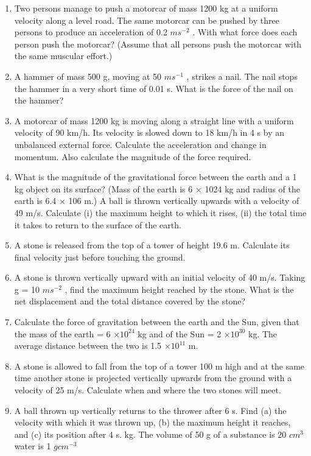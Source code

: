 \begin{enumerate}[label=\arabic*.,ref=\thesubsection.\theenumi]
\item Two persons manage to push a motorcar of mass 1200 kg at a uniform velocity along a level road. The same motorcar can be pushed by three persons to produce an acceleration of 0.2 $m s^{-2}$
. With what force does each person push the motorcar? (Assume that all persons push the motorcar with the same muscular effort.)
\item  A hammer of mass 500 g, moving at 50 $m s^{-1}$ , strikes a nail.
The nail stops the hammer in a very short time of 0.01 s. What is the force of the nail on the hammer?
\item  A motorcar of mass 1200 kg is moving along a straight line with a uniform velocity of 90 km/h. Its velocity is slowed down to 18 km/h in 4 s by an unbalanced external force. Calculate the acceleration and change in momentum. Also calculate the magnitude of the force required.
\item What is the magnitude of the gravitational force between the earth and a 1 kg object on its surface? (Mass of the earth is 6 $\times$ 1024 kg and radius of the earth is 6.4 $\times$ 106 m.)
A ball is thrown vertically upwards with a velocity of 49 m/s. Calculate
(i) the maximum height to which it rises, (ii) the total time it takes to return to the surface of the earth.
\item  A stone is released from the top of a tower of height 19.6 m. Calculate its final velocity just before touching the ground.
\item  A stone is thrown vertically upward with an initial velocity of 40 m/s. Taking g = 10 $ms^{-2}$
, find the maximum height reached
by the stone. What is the net displacement and the total distance covered by the stone?
\item  Calculate the force of gravitation between the earth and the Sun, given that the mass of the earth = 6 $\times 10^{24}$
kg and of the
Sun = 2 $\times 10^{30}$ kg. The average distance between the two is 1.5 $\times 10^{11}$
m.
\item  A stone is allowed to fall from the top of a tower 100 m high and at the same time another stone is projected vertically upwards from the ground with a velocity of 25 m/s. Calculate when and where the two stones will meet.
\item  A ball thrown up vertically returns to the thrower after 6 s. Find
(a) the velocity with which it was thrown up, (b) the maximum height it reaches, and (c) its position after 4 s.
 kg. 
The volume of 50 g of a substance is 20 $cm^3$ water is 1 $g cm^{-3}$

\end{enumerate}
